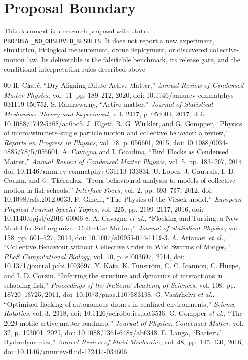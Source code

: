 \documentclass[conference]{../../../../Conference-LaTeX-template_10-17-19/IEEEtran}
\begin{document}
\section{Proposal Boundary}
This document is a research proposal with status \texttt{PROPOSAL\_NO\_OBSERVED\_RESULTS}. It does not report a new experiment, simulation, biological measurement, drone deployment, or discovered collective-motion law. Its deliverable is the falsifiable benchmark, its release gate, and the conditional interpretation rules described above.

\balance
\begin{thebibliography}{00}
 H. Chat\'{e}, ``Dry Aligning Dilute Active Matter,'' \emph{Annual Review of Condensed Matter Physics}, vol. 11, pp. 189--212, 2020, doi: 10.1146/annurev-conmatphys-031119-050752.
 S. Ramaswamy, ``Active matter,'' \emph{Journal of Statistical Mechanics: Theory and Experiment}, vol. 2017, p. 054002, 2017, doi: 10.1088/1742-5468/aa6bc5.
 J. Elgeti, R. G. Winkler, and G. Gompper, ``Physics of microswimmers--single particle motion and collective behavior: a review,'' \emph{Reports on Progress in Physics}, vol. 78, p. 056601, 2015, doi: 10.1088/0034-4885/78/5/056601.
 A. Cavagna and I. Giardina, ``Bird Flocks as Condensed Matter,'' \emph{Annual Review of Condensed Matter Physics}, vol. 5, pp. 183--207, 2014, doi: 10.1146/annurev-conmatphys-031113-133834.
 U. Lopez, J. Gautrais, I. D. Couzin, and G. Th\'{e}raulaz, ``From behavioural analyses to models of collective motion in fish schools,'' \emph{Interface Focus}, vol. 2, pp. 693--707, 2012, doi: 10.1098/rsfs.2012.0033.
 F. Ginelli, ``The Physics of the Vicsek model,'' \emph{European Physical Journal Special Topics}, vol. 225, pp. 2099--2117, 2016, doi: 10.1140/epjst/e2016-60066-8.
 A. Cavagna \emph{et al.}, ``Flocking and Turning: a New Model for Self-organized Collective Motion,'' \emph{Journal of Statistical Physics}, vol. 158, pp. 601--627, 2014, doi: 10.1007/s10955-014-1119-3.
 A. Attanasi \emph{et al.}, ``Collective Behaviour without Collective Order in Wild Swarms of Midges,'' \emph{PLoS Computational Biology}, vol. 10, p. e1003697, 2014, doi: 10.1371/journal.pcbi.1003697.
 Y. Katz, K. Tunstr\"om, C. C. Ioannou, C. Huepe, and I. D. Couzin, ``Inferring the structure and dynamics of interactions in schooling fish,'' \emph{Proceedings of the National Academy of Sciences}, vol. 108, pp. 18720--18725, 2011, doi: 10.1073/pnas.1107583108.
 G. Vas\'{a}rhelyi \emph{et al.}, ``Optimized flocking of autonomous drones in confined environments,'' \emph{Science Robotics}, vol. 3, 2018, doi: 10.1126/scirobotics.aat3536.
 G. Gompper \emph{et al.}, ``The 2020 motile active matter roadmap,'' \emph{Journal of Physics: Condensed Matter}, vol. 32, p. 193001, 2020, doi: 10.1088/1361-648x/ab6348.
 E. Lauga, ``Bacterial Hydrodynamics,'' \emph{Annual Review of Fluid Mechanics}, vol. 48, pp. 105--130, 2016, doi: 10.1146/annurev-fluid-122414-034606.
\end{thebibliography}
\end{document}
